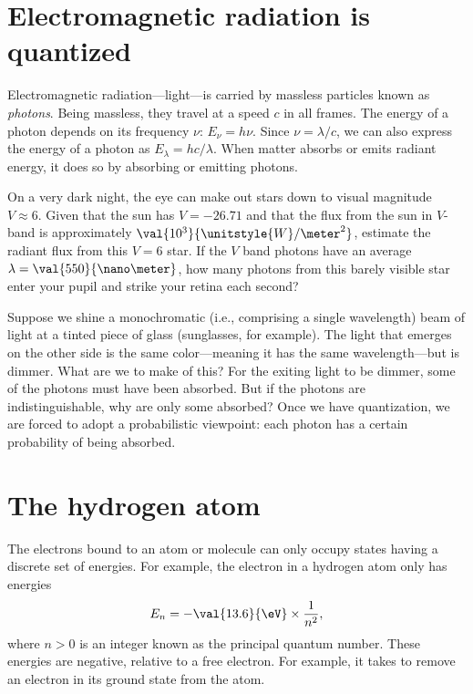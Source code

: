 
\section{Electromagnetic radiation is quantized}

Electromagnetic radiation---light---is carried by massless particles known as \emph{photons}. Being massless, they travel at a speed $c$ in all frames.  The energy of a photon depends on its frequency $\nu$: $E_{\nu} = h\nu$. Since $\nu = \lambda/c$, we can also express the energy of a photon as $E_{\lambda} = hc/\lambda$. When matter absorbs or emits radiant energy, it does so by absorbing or emitting photons.

\begin{exercisebox}
On a very dark night, the eye can make out stars down to visual magnitude $V\approx 6$. Given that the sun has $V=-26.71$ and that the flux from the sun in $V$-band is approximately $\val{10^{3}}{\unitstyle{W}/\meter^{2}}$, estimate the radiant flux from this $V=6$ star.  If the $V$ band photons have an average $\lambda = \val{550}{\nano\meter}$, how many photons from this barely visible star enter your pupil and strike your retina each second?
\end{exercisebox}

Suppose we shine a monochromatic (i.e., comprising a single wavelength) beam of light at a tinted piece of glass (sunglasses, for example).  The light that emerges on the other side is the same color---meaning it has the same wavelength---but is dimmer. What are we to make of this? For the exiting light to be dimmer, some of the photons must have been absorbed. But if the photons are indistinguishable, why are only some absorbed? Once we have quantization, we are forced to adopt a probabilistic viewpoint: each photon has a certain probability of being absorbed.

\section{The hydrogen atom}

The electrons bound to an atom or molecule can only occupy states having a discrete set of energies. For example, the electron in a hydrogen atom only has energies
\begin{equation}\label{e.H-levels}
	E_{n} = -\val{13.6}{\eV}\times \frac{1}{n^{2}},
\end{equation}
where $n > 0$ is an integer known as the principal quantum number.  These energies are negative, relative to a free electron.  For example, it takes  to remove an electron in its ground state from the atom.

